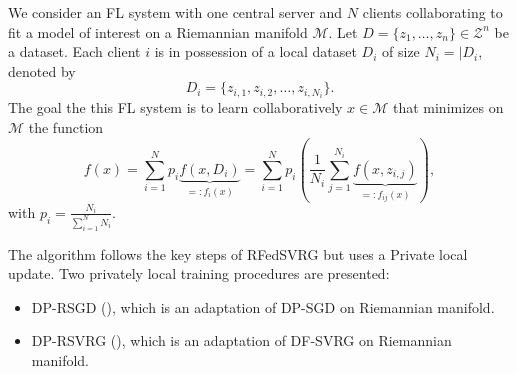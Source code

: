 \documentclass[10pt,a4paper]{book}
\theoremstyle{definition}
\theoremstyle{plain}
\theoremstyle{remark}
\newcommand \M {\mathcal{M}}
\begin{document}
We consider an FL system with one central server and $N$ clients collaborating to fit a model of interest on a Riemannian manifold $\M$. Let $D=\{z_1,\dots, z_n\}\in \mathcal{Z}^{n}$ be a dataset.
Each client $i$ is in possession of a local dataset $D_i$ of size $N_i=|D_i$, denoted by
$$D_i=\{z_{i,1},z_{i,2},\dots, z_{i,N_i}\}.$$
The goal the this FL system is to learn collaboratively $x\in \M$ that minimizes on $\M$ the function
$$f(x)=\sum_{i=1}^{N}p_i\underbrace{f(x,D_i)}_{=:f_i(x)}=\sum_{i=1}^{N}p_i\left(\frac{1}{N_i}\sum_{j=1}^{N_i}\underbrace{f(x,z_{i,j})}_{=:f_{ij}(x)}\right),$$
with $\displaystyle p_i=\frac{N_i}{\sum_{i=1}^{N}N_i}$.

The algorithm follows the key steps of RFedSVRG but uses a Private local update. Two privately local training procedures are presented:
\begin{itemize}
\item DP-RSGD (\cite{han2024differentially}), which is an adaptation of DP-SGD on Riemannian manifold.
\item DP-RSVRG (\cite{utpala2022improved}), which is an adaptation of DF-SVRG on Riemannian manifold.
\end{itemize}
\newpage 




\end{document}
